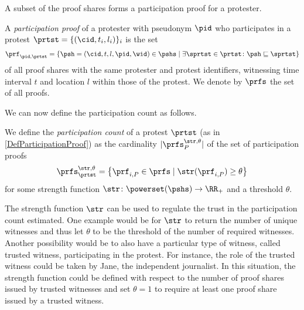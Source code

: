 A subset of the proof shares forms a participation proof for a protester.


\begin{definition}%
  \label{DefParticipationProof}\label{DefParticipationProofs}
  A \emph{participation proof} of a protester with pseudonym \(\pid\) who participates in a protest \(\prtst = \{ (\cid, t_i, l_i) \}_i\) is the set
  \begin{multline}
    \nonumber
    \prf_{\pid, \prtst} =
    \left\{ \psh = (\cid, t, l, \pid, \wid)\in \pshs \mid
      \exists \sprtst\in \prtst\colon \psh\sqsubseteq \sprtst \right\}
  \end{multline}
  of all proof shares with the same protester and protest identifiers, witnessing time interval \(t\) and location \(l\) within those of the protest.
  We denote by \(\prfs\) the set of all proofs.
\end{definition}

\NewFunction{\str}{\varsigma}

We can now define the participation count as follows.
\begin{definition}%
  \label{DefParticipationCount}
  We define the \emph{participation count} of a protest \(\prtst\) (as in \cref{DefParticipationProof}) as the cardinality 
  \(|\prfs_{P}^{\str,\theta}|\) of the set of participation proofs \[
    \prfs_{\prtst}^{\str,\theta} = \left\{ \prf_{i,P} \in \prfs \mid
      \str(\prf_{i,P})\geq \theta \right\}
  \] for some strength function \(\str\colon \powerset(\pshs)\to \RR_+\) and a 
  threshold \(\theta\).
\end{definition}

The strength function \(\str\) can be used to regulate the trust in the participation count estimated.
One example would be for \(\str\) to return the number of unique witnesses and thus let \(\theta\) to be the threshold of the number of required witnesses.
Another possibility would be to also have a particular type of witness, called trusted witness, participating in the protest. 
For instance, the role of the trusted witness could be taken by Jane, the independent journalist. 
In this situation, the strength function could be defined with respect to the number of proof shares issued by trusted witnesses and set \(\theta = 1\) to require at least one proof share issued by a trusted witness.